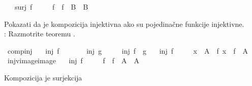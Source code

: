 \begin{isabellebody}
\begin{exercise}[subtitle=Svojstva funkcija]
\ \ \ {\isachardoublequoteopen}surj\ f{\isachardoublequoteclose}\isanewline
\ \ \ \ \ {\isachardoublequoteopen}f\ {\isacharbackquote}{\kern0pt}\ {\isacharparenleft}{\kern0pt}f\ {\isacharminus}{\kern0pt}{\isacharbackquote}{\kern0pt}\ B{\isacharparenright}{\kern0pt}\ {\isacharequal}{\kern0pt}\ B{\isachardoublequoteclose}%
\isadelimproof
%
\endisadelimproof
%
\isatagproof
%
\endisatagproof
{\isafoldproof}%
%
\isadelimproof
%
\endisadelimproof
%
\begin{isamarkuptext}%
Pokazati da je kompozicija injektivna 
      ako su pojedinačne funkcije injektivne.\\
      : Razmotrite teoremu .%
\end{isamarkuptext}\isamarkuptrue%
\isamarkupfalse%
\ comp{\isacharunderscore}{\kern0pt}inj{\isacharcolon}{\kern0pt}\isanewline
\ \ \ {\isachardoublequoteopen}inj\ f{\isachardoublequoteclose}\isanewline
\ \ \ \ \ \ \ {\isachardoublequoteopen}inj\ g{\isachardoublequoteclose}\isanewline
\ \ \ \ \ {\isachardoublequoteopen}inj\ {\isacharparenleft}{\kern0pt}f\ {\isasymcirc}\ g{\isacharparenright}{\kern0pt}{\isachardoublequoteclose}%
\isadelimproof
%
\endisadelimproof
%
\isatagproof
%
\endisatagproof
{\isafoldproof}%
%
\isadelimproof
%
\endisadelimproof
\isanewline
{}\isamarkupfalse%
\isanewline
\ \ \ {\isachardoublequoteopen}inj\ f{\isachardoublequoteclose}\isanewline
\ \ \ \ \ {\isachardoublequoteopen}x\ {\isasymin}\ A\ {\isasymlongleftrightarrow}\ f\ x\ {\isasymin}\ f\ {\isacharbackquote}{\kern0pt}\ A{\isachardoublequoteclose}%
\isadelimproof
%
\endisadelimproof
%
\isatagproof
%
\endisatagproof
{\isafoldproof}%
%
\isadelimproof
%
\endisadelimproof
\isanewline
\isanewline
{}\isamarkupfalse%
\ inj{\isacharunderscore}{\kern0pt}vimage{\isacharunderscore}{\kern0pt}image{\isacharcolon}{\kern0pt}\isanewline
\ \ \ {\isachardoublequoteopen}inj\ f{\isachardoublequoteclose}\isanewline
\ \ \ \ \ {\isachardoublequoteopen}f\ {\isacharminus}{\kern0pt}{\isacharbackquote}{\kern0pt}\ {\isacharparenleft}{\kern0pt}f\ {\isacharbackquote}{\kern0pt}\ A{\isacharparenright}{\kern0pt}\ {\isacharequal}{\kern0pt}\ A{\isachardoublequoteclose}%
\isadelimproof
%
\endisadelimproof
%
\isatagproof
%
\endisatagproof
{\isafoldproof}%
%
\isadelimproof
%
\endisadelimproof
%
\begin{isamarkuptext}%
Kompozicija je surjekcija

\end{isamarkuptext}
\end{exercise}
\end{isabellebody}

